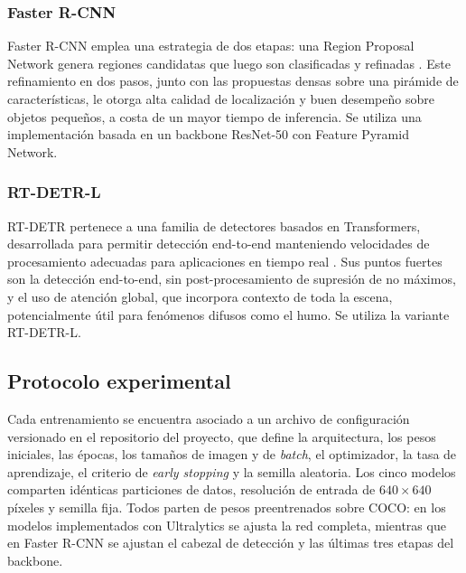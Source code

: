 \documentclass[conference]{IEEEtran}
\begin{document}

\subsubsection{Faster R-CNN}

Faster R-CNN emplea una estrategia de dos etapas: una Region Proposal
Network genera regiones candidatas que luego son clasificadas y refinadas
\cite{b2}. Este refinamiento en dos pasos, junto con las propuestas densas
sobre una pirámide de características, le otorga alta calidad de
localización y buen desempeño sobre objetos pequeños, a costa de un mayor
tiempo de inferencia. Se utiliza una implementación basada en un backbone
ResNet-50 con Feature Pyramid Network.


\subsubsection{RT-DETR-L}

RT-DETR pertenece a una familia de detectores basados en Transformers,
desarrollada para permitir detección end-to-end manteniendo velocidades de
procesamiento adecuadas para aplicaciones en tiempo real \cite{b3}. Sus
puntos fuertes son la detección end-to-end, sin post-procesamiento de
supresión de no máximos, y el uso de atención global, que incorpora contexto
de toda la escena, potencialmente útil para fenómenos difusos como el humo.
Se utiliza la variante RT-DETR-L.


\subsection{Protocolo experimental}

Cada entrenamiento se encuentra asociado a un archivo de configuración
versionado en el repositorio del proyecto, que define la arquitectura, los
pesos iniciales, las épocas, los tamaños de imagen y de \textit{batch}, el
optimizador, la tasa de aprendizaje, el criterio de \textit{early stopping}
y la semilla aleatoria. Los cinco modelos comparten idénticas particiones de
datos, resolución de entrada de $640 \times 640$ píxeles y semilla fija.
Todos parten de pesos preentrenados sobre COCO: en los modelos
implementados con Ultralytics \cite{b5} se ajusta la red completa, mientras
que en Faster R-CNN se ajustan el cabezal de detección y las últimas tres
etapas del backbone.
\end{document}
